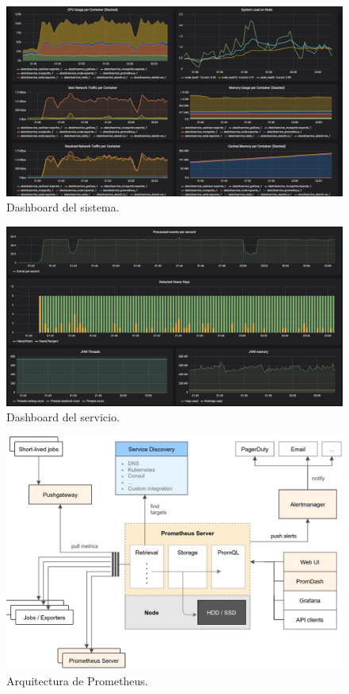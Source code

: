 \documentclass[a4paper,12pt, oneside]{article}
\begin{document}
\begin{figure}[h!]
	\centering
	\includegraphics[width=1.45\textwidth,angle=90]{./graph/system_dashboard.png}
	\caption{Dashboard del sistema.}
	\label{diag:system_dashbard}
\end{figure}

\begin{figure}[h]
	\centering
	\includegraphics[width=1.5\textwidth,angle=90]{./graph/service_dashboard.png}
	\caption{Dashboard del servicio.}
	\label{diag:service_dashboard}
\end{figure}

\begin{figure}[h]
	\centering
	\includegraphics[width=1.2\textwidth,angle=90]{./graph/prometheus.jpeg}
	\caption{Arquitectura de Prometheus.}
	\label{diag:prometheus}
\end{figure}

\clearpage

\listoffigures

\clearpage

\nocite{*}
\printbibliography

\clearpage\mbox{}

\thispagestyle{empty}
\clearpage
\end{document}
